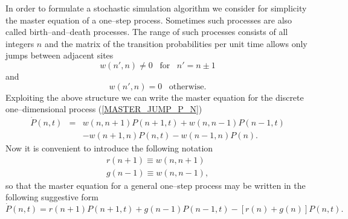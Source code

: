 In order to formulate a stochastic simulation algorithm we 
consider for simplicity the master equation of a one--step 
process. Sometimes such processes are also called birth--and--death
processes. The range of such processes consists of all integers
$n$ and the matrix of the transition probabilities per unit time
allows only jumps between adjacent sites
\begin{equation*}
w(n',n) \neq 0 \;\;\; \text{for} \;\;\; n'=n \pm 1
\end{equation*}
and
\begin{equation*}
w(n',n) = 0 \;\;\; \text{otherwise}.
\end{equation*}
Exploiting the above structure we can write the master equation 
for the discrete one--dimensional process (\ref{MASTER_JUMP_P_N})
\begin{eqnarray*}
\dot{P}(n,t) &=& w(n,n+1)P(n+1,t) + w(n,n-1)P(n-1,t) \\
       && -w(n+1,n)P(n,t) -w(n-1,n)P(n).
\end{eqnarray*}
Now it is convenient to introduce the following notation
\begin{eqnarray*}
r(n+1) \equiv w(n,n+1) \\
g(n-1) \equiv w(n,n-1),
\end{eqnarray*}
so that the master equation for a general one--step process 
may be written in the following 
suggestive form
\begin{equation}
\label{MASTER_ONE_STEP}
\dot{P}(n,t) = r(n+1)P(n+1,t) + g(n-1)P(n-1,t)
        -[r(n)+ g(n)]P(n,t).
\end{equation}

